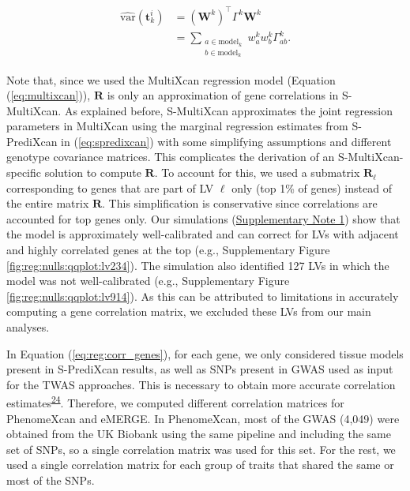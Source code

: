 \documentclass[
  a4paper,
]{article}
\begin{document}
\begin{equation}
\begin{split}
\widehat{\mathrm{var}}(\mathbf{t}_k^i) & = (\mathbf{W}^k)^\top \Gamma^k \mathbf{W}^k \\
        & = \sum_{\substack{a \in \mathrm{model}_k \\ b \in \mathrm{model}_k}} w_a^k w_b^k \Gamma_{ab}^k.
\end{split}
\label{eq:reg:var_gene}\end{equation}

Note that, since we used the MultiXcan regression model (Equation (\ref{eq:multixcan})), \(\mathbf{R}\) is only an approximation of gene correlations in S-MultiXcan.
As explained before, S-MultiXcan approximates the joint regression parameters in MultiXcan using the marginal regression estimates from S-PrediXcan in (\ref{eq:spredixcan}) with some simplifying assumptions and different genotype covariance matrices.
This complicates the derivation of an S-MultiXcan-specific solution to compute \(\mathbf{R}\).
To account for this, we used a submatrix \(\mathbf{R}_{\ell}\) corresponding to genes that are part of LV \(\ell\) only (top 1\% of genes) instead of the entire matrix \(\mathbf{R}\).
This simplification is conservative since correlations are accounted for top genes only.
Our simulations (\protect\hyperlink{sm:reg:null_sim}{Supplementary Note 1}) show that the model is approximately well-calibrated and can correct for LVs with adjacent and highly correlated genes at the top (e.g., Supplementary Figure \ref{fig:reg:nulls:qqplot:lv234}).
The simulation also identified 127 LVs in which the model was not well-calibrated (e.g., Supplementary Figure \ref{fig:reg:nulls:qqplot:lv914}).
As this can be attributed to limitations in accurately computing a gene correlation matrix, we excluded these LVs from our main analyses.

In Equation (\ref{eq:reg:corr_genes}), for each gene, we only considered tissue models present in S-PrediXcan results, as well as SNPs present in GWAS used as input for the TWAS approaches.
This is necessary to obtain more accurate correlation estimates\textsuperscript{\protect\hyperlink{ref-1FFzCXo1s}{24}}.
Therefore, we computed different correlation matrices for PhenomeXcan and eMERGE.
In PhenomeXcan, most of the GWAS (4,049) were obtained from the UK Biobank using the same pipeline and including the same set of SNPs, so a single correlation matrix was used for this set.
For the rest, we used a single correlation matrix for each group of traits that shared the same or most of the SNPs.
\end{document}
